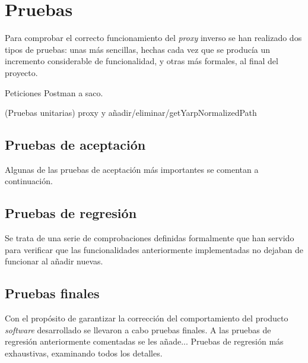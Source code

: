\documentclass[11pt,spanish,listoffigures]{tfgetsinf}
\begin{document}


	\section{Pruebas} \label{pruebas}

Para comprobar el correcto funcionamiento del \emph{proxy} inverso se han realizado dos tipos de pruebas: unas más sencillas, hechas cada vez que se producía un incremento considerable de funcionalidad, y otras más formales, al final del proyecto.

Peticiones Postman a saco.

(Pruebas unitarias) proxy y añadir/eliminar/getYarpNormalizedPath


		\subsection{Pruebas de aceptación} \label{pruebasDeAceptacion}
		
Algunas de las pruebas de aceptación más importantes se comentan a continuación.


		\subsection{Pruebas de regresión}

Se trata de una serie de comprobaciones definidas formalmente que han servido para verificar que las funcionalidades anteriormente implementadas no dejaban de funcionar al añadir nuevas.


		\subsection{Pruebas finales}

Con el propósito de garantizar la corrección del comportamiento del producto \emph{software} desarrollado se llevaron a cabo pruebas finales. A las pruebas de regresión anteriormente comentadas se les añade... Pruebas de regresión más exhaustivas, examinando todos los detalles.
\end{document}
